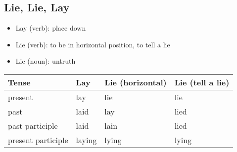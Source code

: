 \documentclass[a4paper,12pt]{report}
\begin{document}
\subsection{Lie, Lie, Lay}

\begin{itemize}
  \item Lay (verb): place down
  \item Lie (verb): to be in horizontal position, to tell a lie
  \item Lie (noun): untruth
\end{itemize}

\begin{center}
  \begin{tabular}{| m{3.5cm} || m{3.5cm} | m{3.5cm} | m{3.5cm} | }
    \hline
    Tense              & Lay    & Lie (horizontal) & Lie (tell a lie) \\
    \hline
    \hline
    present            & lay    & lie              & lie              \\
    \hline
    past               & laid   & lay              & lied             \\
    \hline
    past participle    & laid   & lain             & lied             \\
    \hline
    present participle & laying & lying            & lying            \\
    \hline
  \end{tabular}

\end{center}
\end{document}
